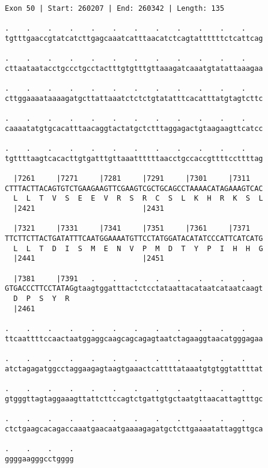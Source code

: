 \documentclass{article}
\begin{document}
\begin{Verbatim}[fontfamily=courier]
Exon 50 | Start: 260207 | End: 260342 | Length: 135

.    .    .    .    .    .    .    .    .    .    .    .    
tgtttgaaccgtatcatcttgagcaaatcatttaacatctcagtattttttctcattcag

.    .    .    .    .    .    .    .    .    .    .    .    
cttaataatacctgccctgcctactttgtgtttgttaaagatcaaatgtatattaaagaa

.    .    .    .    .    .    .    .    .    .    .    .    
cttggaaaataaaagatgcttattaaatctctctgtatatttcacatttatgtagtcttc

.    .    .    .    .    .    .    .    .    .    .    .    
caaaatatgtgcacatttaacaggtactatgctctttaggagactgtaagaagttcatcc

.    .    .    .    .    .    .    .    .    .    .    .    
tgttttaagtcacacttgtgatttgttaaattttttaacctgccaccgttttccttttag

  |7261     |7271     |7281     |7291     |7301     |7311   
CTTTACTTACAGTGTCTGAAGAAGTTCGAAGTCGCTGCAGCCTAAAACATAGAAAGTCAC
  L  L  T  V  S  E  E  V  R  S  R  C  S  L  K  H  R  K  S  L
  |2421                         |2431                       

  |7321     |7331     |7341     |7351     |7361     |7371   
TTCTTCTTACTGATATTTCAATGGAAAATGTTCCTATGGATACATATCCCATTCATCATG
  L  L  T  D  I  S  M  E  N  V  P  M  D  T  Y  P  I  H  H  G
  |2441                         |2451                       

  |7381     |7391   .    .    .    .    .    .    .    .    
GTGACCCTTCCTATAGgtaagtggatttactctcctataattacataatcataatcaagt
  D  P  S  Y  R                                             
  |2461                                                     

.    .    .    .    .    .    .    .    .    .    .    .    
ttcaattttccaactaatggaggcaagcagcagagtaatctagaaggtaacatgggagaa

.    .    .    .    .    .    .    .    .    .    .    .    
atctagagatggcctaggaagagtaagtgaaactcattttataaatgtgtggtattttat

.    .    .    .    .    .    .    .    .    .    .    .    
gtgggttagtaggaaagttattcttccagtctgattgtgctaatgttaacattagtttgc

.    .    .    .    .    .    .    .    .    .    .    .    
ctctgaagcacagaccaaatgaacaatgaaaagagatgctcttgaaaatattaggttgca

.    .    .    .
ggggaagggcctgggg
\end{Verbatim}
\newpage
\end{document}
